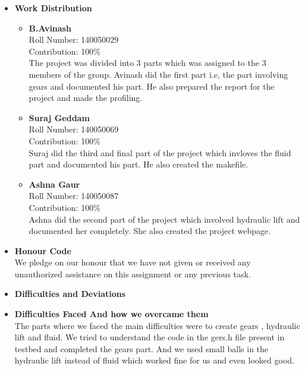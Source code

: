 \documentclass{article}
\begin{document}
\begin{itemize}
	\item[] \textbf{\LARGE Work Distribution} \\
	   \begin{itemize}[label=$\blacksquare$] \vspace{0cm}
           \item \textbf{\Large B.Avinash }\\
           \large Roll Number: 140050029\\ Contribution: 100\% \\ The project was divided into 3 parts which was assigned to the 3 members of the group. Avinash did the first part i.e, the part involving gears and documented his part. He also prepared the report for the project and made the profiling. \vspace{0.65 cm}
           \item \textbf{\Large Suraj Geddam }\\ 
           \large Roll Number: 140050069\\ Contribution: 100\% \\ Suraj did the third and final part of the project which invloves the fluid part and documented his part. He also created the makefile.\vspace{0.65 cm}
           \item \textbf{\Large Ashna Gaur }\\ 
           \large Roll Number: 140050087\\ Contribution: 100\% \\  Ashna did the second part of the project which involved hydraulic lift and documented her completely. She also created the project webpage. \vspace{0.65 cm}
       \end{itemize}
       \item[] \textbf{\LARGE Honour Code} \\ 
       \large We pledge on our honour that we have not given or received any unauthorized assistance on this assignment or any previous task.\\\vspace{0.4 cm}
    \clearpage   

	\item[] \textbf{\LARGE Difficulties and Deviations} \\
	\item[] \textbf{\Large Difficulties Faced And how we overcame them} \\
    \large The parts where we faced the main difficulties were to create gears , hydraulic lift and fluid. We tried to understand the code in the gers.h file present in testbed and completed the gears part. And we used small balls in the hydraulic lift instead of fluid which worked fine for us and even looked good.\\ \vspace{0.4 cm}


\end{itemize}
\end{document}
